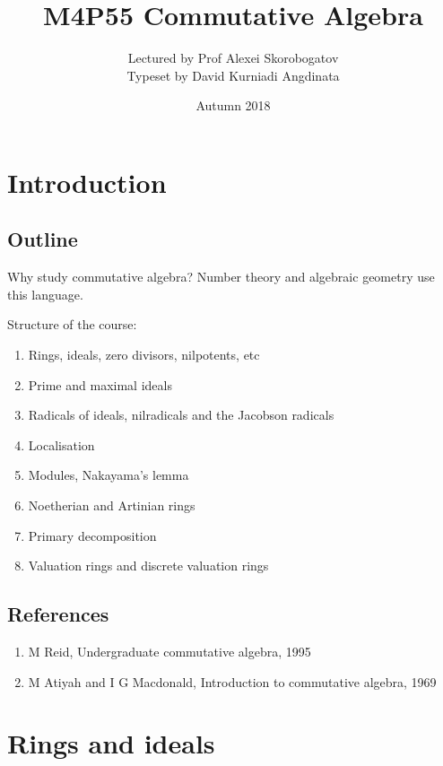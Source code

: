 \documentclass{article}
\title{M4P55 Commutative Algebra}
\author{Lectured by Prof Alexei Skorobogatov \\ Typeset by David Kurniadi Angdinata}
\date{Autumn 2018}
\theoremstyle{definition}\newtheorem{definition}{Definition}[section]
\theoremstyle{definition}\newtheorem{remark}[definition]{Remark}
\theoremstyle{definition}\newtheorem*{example}{Example}
\theoremstyle{definition}\newtheorem*{note}{Note}
\begin{document}
\maketitle

\vfill

\tableofcontents

\pagebreak


\section{Introduction}

\subsection{Outline}

Why study commutative algebra? Number theory and algebraic geometry use this language.

Structure of the course:
\begin{enumerate}
\item Rings, ideals, zero divisors, nilpotents, etc
\item Prime and maximal ideals
\item Radicals of ideals, nilradicals and the Jacobson radicals
\item Localisation
\item Modules, Nakayama's lemma
\item Noetherian and Artinian rings
\item Primary decomposition
\item Valuation rings and discrete valuation rings
\end{enumerate}

\subsection{References}

\begin{enumerate}
\item M Reid, Undergraduate commutative algebra, 1995
\item M Atiyah and I G Macdonald, Introduction to commutative algebra, 1969
\end{enumerate}

\section{Rings and ideals}
\end{document}
